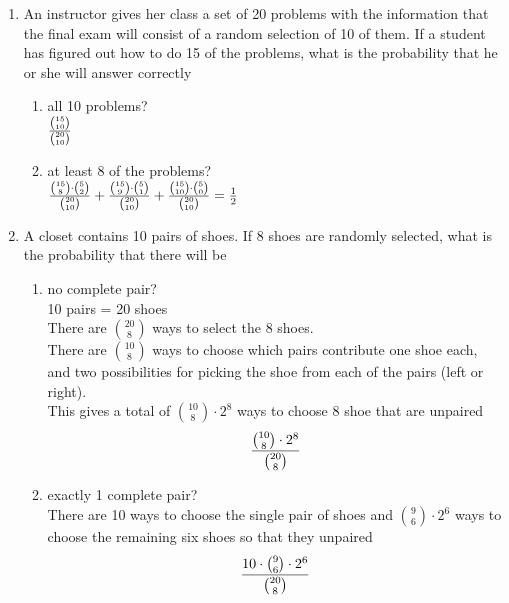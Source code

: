 \documentclass[12pt]{article}%
\newcommand{\0}{{\bf 0}}
\begin{document}
\begin{enumerate}
\begin{enumerate}
\end{enumerate}

















\item 
An instructor gives her class a set of 20 problems 
with the information that the final exam will consist of a random selection of 10 of them. 
If a student has figured out how to do 15 of the problems, 
what is the probability that he or she will answer correctly
\begin{enumerate}
\item all 10 problems?
\\
{\color{blue}{\bf Sol.}}
$\frac{{15 \choose 10}}{{20 \choose 10}}$ 
\item at least 8 of the problems?
\\
{\color{blue}{\bf Sol.}}
$\frac{{15 \choose 8}\cdot{5 \choose 2}}{{20 \choose 10}}
+ \frac{{15 \choose 9}\cdot{5 \choose 1}}{{20 \choose 10}}
+\frac{{15 \choose 10}\cdot{5 \choose 0}}{{20 \choose 10}}=\frac{1}{2}$ 
\end{enumerate}










\item 
A closet contains 10 pairs of shoes. 
If 8 shoes are randomly selected, what is the probability that there will be
\begin{enumerate}
\item no complete pair?
\\
{\color{blue}{\bf Sol.}}
 10 pairs = 20 shoes
\\
There are ${20 \choose 8}$ ways to select the 8 shoes.
\\
There are ${10 \choose 8}$ ways to choose which pairs contribute one shoe each, and two possibilities for picking the shoe from each of the pairs (left or right).
\\
This gives a total of ${10 \choose 8}\cdot 2^8$ ways to choose 8 shoe that are unpaired
$$\frac{{10 \choose 8}\cdot 2^8}{{20 \choose 8}} $$

  
      
\item exactly 1 complete pair?
\\
{\color{blue}{\bf Sol.}}
There are 10 ways to choose the single pair of shoes and 
 ${9 \choose 6}\cdot 2^6$ ways to choose the remaining six shoes so that they unpaired
$$\frac{10\cdot{9 \choose 6}\cdot 2^6}{{20 \choose 8}} $$
\end{enumerate}








\end{enumerate}
\end{document}
